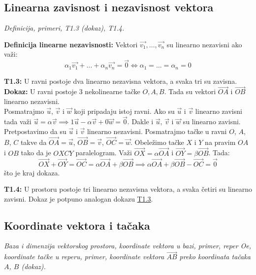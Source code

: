 \documentclass[12pt]{article}
\newcommand{\vek}[1]{\overrightarrow{#1}}
\begin{document}
\subsection{Linearna zavisnost i nezavisnost vektora}
\textit{Definicija, primeri, T1.3 (dokaz), T1.4.}
\par
\vspace*{1cm}

\textbf{Definicija linearne nezavisnosti:} Vektori $\vek{v_1},\dotsc,\vek{v_n}$
su linearno nezavisni ako važi:
$$\alpha_1\vek{v_1}+\dotsc+\alpha_n\vek{v_n}=\vek{0} \iff \alpha_1=
    \dotsc=\alpha_n=0$$
\par

\textbf{T1.3:}\label{theorem:1.3} U ravni postoje dva linearno nezavisna
vektora, a svaka tri su zavisna.\\
\textbf{Dokaz:} U ravni postoje 3 nekolinearne tačke $O, A, B$. Tada su vektori
$\vek{OA}$ i $\vek{OB}$ linearno nezavisni.\\
Posmatrajmo $\vek{u}$, $\vek{v}$ i $\vek{w}$ koji pripadaju istoj ravni. Ako su
$\vek{u}$ i $\vek{v}$ linearno zavisni tada važi $\vek{u}=\alpha\vek{v}
    \implies 1\vek{u}-\alpha\vek{v}+0\vek{w}=\vek{0}$. Dakle i
$\vek{u}$, $\vek{v}$ i $\vek{w}$ su linearno zavisni.\\
Pretpostavimo da su $\vek{u}$ i $\vek{v}$ linearno nezavisni. Posmatrajmo tačke
u ravni $O$, $A$, $B$, $C$ takve da $\vek{OA}=\vek{u}$, $\vek{OB}=\vek{v}$,
$\vek{OC}=\vek{w}$. Obeležimo tačke $X$ i $Y$ na pravim $OA$ i $OB$ tako da je
$OXCY$ paralelogram. Važi $\vek{OX}=\alpha\vek{OA}$ i $\vek{OY}=\beta
    \vek{OB}$. Tada:
$$\vek{OX}+\vek{OY}=\vek{OC}=\alpha\vek{OA}+\beta\vek{OB} \implies
    \alpha\vek{OA}+\beta\vek{OB}-\vek{OC}=\vek{0}$$
što je kraj dokaza.
\par

\textbf{T1.4:} U prostoru postoje tri linearno nezavisna vektora, a svaka četiri su
linearno zavisni. Dokaz je potpuno analogan dokazu \hyperref[theorem:1.3]{T1.3}.


\subsection{Koordinate vektora i tačaka}
\textit{Baza i dimenzija vektorskog prostora, koordinate vektora u bazi,
    primer, reper Oe, koordinate tačke u reperu, primer, koordinate vektora
    $\vek{AB}$ preko koordinata tačaka $A$, $B$ (dokaz).}
\par
\vspace*{1cm}
\end{document}
